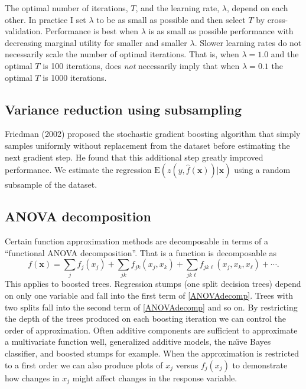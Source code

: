\documentclass{article}
\newcommand{\EV}{\mathrm{E}}
\begin{document}
The optimal number of iterations, $T$, and the learning rate, $\lambda$, depend on each other. In practice I set $\lambda$ to be as small as possible and then select $T$ by cross-validation. Performance is best when $\lambda$ is as small as possible performance with decreasing marginal utility for smaller and smaller $\lambda$. Slower learning rates do not necessarily scale the number of optimal iterations. That is, when $\lambda=1.0$ and the optimal $T$ is 100 iterations, does {\it not} necessarily imply that when $\lambda=0.1$ the optimal $T$ is 1000 iterations.

\subsection{Variance reduction using subsampling}

Friedman (2002) proposed the stochastic gradient boosting algorithm that simply samples uniformly without replacement from the dataset before estimating the next gradient step. He found that this additional step greatly improved performance. We estimate the regression $\EV(z(y,\hat f(\mathbf{x}))|\mathbf{x})$ using a random subsample of the dataset.

\subsection{ANOVA decomposition}

Certain function approximation methods are decomposable in terms of a ``functional ANOVA decomposition''. That is a function is decomposable as
\begin{equation} 
\label{ANOVAdecomp} 
f(\mathbf{x}) = \sum_j f_j(x_j) + \sum_{jk} f_{jk}(x_j,x_k) + \sum_{jk\ell} f_{jk\ell}(x_j,x_k,x_\ell) + \cdots. 
\end{equation} This applies to boosted trees. Regression stumps (one split decision trees) depend on only one variable and fall into the first term of \ref{ANOVAdecomp}. Trees with two splits fall into the second term of \ref{ANOVAdecomp} and so on. By restricting the depth of the trees produced on each boosting iteration we can control the order of approximation. Often additive components are sufficient to approximate a multivariate function well, generalized additive models, the na\"{\i}ve Bayes classifier, and boosted stumps for example. When the approximation is restricted to a first order we can also produce plots of $x_j$ versus $f_j(x_j)$ to demonstrate how changes in $x_j$ might affect changes in the response variable.
\end{document}
